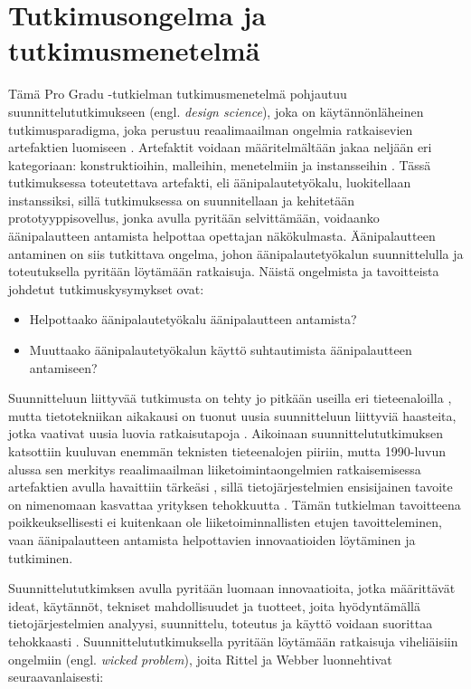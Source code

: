 \documentclass[utf8]{gradu3}
\begin{document}
%

\chapter{Tutkimusongelma ja tutkimusmenetelmä}

Tämä Pro Gradu -tutkielman tutkimusmenetelmä pohjautuu suunnittelututkimukseen (engl. \textit{design science}), joka on käytännönläheinen tutkimusparadigma, joka perustuu reaalimaailman ongelmia ratkaisevien artefaktien luomiseen \parencite[][]{hevner2004}. Artefaktit voidaan määritelmältään jakaa neljään eri kategoriaan: konstruktioihin, malleihin, menetelmiin ja instansseihin \parencite[][]{hevner2004}. Tässä tutkimuksessa toteutettava artefakti, eli äänipalautetyökalu, luokitellaan instanssiksi, sillä tutkimuksessa on suunnitellaan ja kehitetään prototyyppisovellus, jonka avulla pyritään selvittämään, voidaanko äänipalautteen antamista helpottaa opettajan näkökulmasta. Äänipalautteen antaminen on siis tutkittava ongelma, johon äänipalautetyökalun suunnittelulla ja toteutuksella pyritään löytämään ratkaisuja. Näistä ongelmista ja tavoitteista johdetut tutkimuskysymykset ovat:

\begin{itemize}
  \item Helpottaako äänipalautetyökalu äänipalautteen antamista?
  \item Muuttaako äänipalautetyökalun käyttö suhtautimista äänipalautteen antamiseen?
\end{itemize}

Suunnitteluun liittyvää tutkimusta on tehty jo pitkään useilla eri tieteenaloilla \parencite[][]{cross2001}, mutta tietotekniikan aikakausi on tuonut uusia suunnitteluun liittyviä haasteita, jotka vaativat uusia luovia ratkaisutapoja \parencite[][]{design}. Aikoinaan suunnittelututkimuksen katsottiin kuuluvan enemmän teknisten tieteenalojen piiriin, mutta 1990-luvun alussa sen merkitys reaalimaailman liiketoimintaongelmien ratkaisemisessa artefaktien avulla havaittiin tärkeäsi \parencite[][]{design}, sillä tietojärjestelmien ensisijainen tavoite on nimenomaan kasvattaa yrityksen tehokkuutta \parencite[][]{hevner2004}. Tämän tutkielman tavoitteena poikkeuksellisesti ei kuitenkaan ole liiketoiminnallisten etujen tavoitteleminen, vaan äänipalautteen antamista helpottavien innovaatioiden löytäminen ja tutkiminen.

Suunnittelututkimksen avulla pyritään luomaan innovaatioita, jotka määrittävät ideat, käytännöt, tekniset mahdollisuudet ja tuotteet, joita hyödyntämällä tietojärjestelmien analyysi, suunnittelu, toteutus ja käyttö voidaan suorittaa tehokkaasti \parencite[][]{hevner2004}. Suunnittelututkimuksella pyritään löytämään ratkaisuja viheliäisiin ongelmiin (engl. \textit{wicked problem}), joita Rittel ja Webber \parencite[][]{wicked} luonnehtivat seuraavanlaisesti: 
\end{document}
